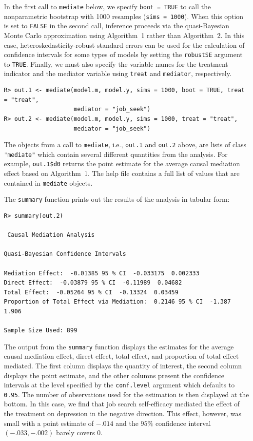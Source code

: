 \documentclass[11pt,letterpaper]{article}
\theoremstyle{plain}
\begin{document}
In the first call to \texttt{mediate} below, we specify \texttt{boot
  = TRUE} to call the nonparametric bootstrap with 1000 resamples
({\tt sims = 1000}). When this option is set to {\tt FALSE} in the second
call, inference proceeds via the quasi-Bayesian Monte Carlo
approximation using Algorithm~1 rather than Algorithm~2.  In this case,
heteroskedasticity-robust standard errors can be used for the calculation of
confidence intervals for some types of models by setting the {\tt robustSE}
argument to {\tt TRUE}.  Finally, we must also
specify the variable names for the treatment indicator and the
mediator variable using {\tt treat} and {\tt mediator}, respectively.
\begin{verbatim}
R> out.1 <- mediate(model.m, model.y, sims = 1000, boot = TRUE, treat = "treat",
                    mediator = "job_seek")
R> out.2 <- mediate(model.m, model.y, sims = 1000, treat = "treat",
                    mediator = "job_seek")
\end{verbatim}
The objects from a call to \texttt{mediate}, i.e., {\tt out.1} and
{\tt out.2} above, are lists of class {\tt "mediate"} which contain several different
quantities from the analysis.  For example, \texttt{out.1\$d0} returns
the point estimate for the average causal mediation effect based on
Algorithm~1.  The help file contains a full list of values that are
contained in \texttt{mediate} objects.

The \texttt{summary}
function prints out the results of the analysis in tabular form:
\begin{verbatim}
R> summary(out.2)

 Causal Mediation Analysis

Quasi-Bayesian Confidence Intervals

Mediation Effect:  -0.01385 95 % CI  -0.033175  0.002333
Direct Effect:  -0.03879 95 % CI  -0.11989  0.04682
Total Effect:  -0.05264 95 % CI  -0.13324  0.03459
Proportion of Total Effect via Mediation:  0.2146 95 % CI  -1.387  1.906

Sample Size Used: 899
\end{verbatim}
The output from the {\tt summary} function displays the estimates
for the average causal mediation effect, direct effect, total effect,
and proportion of total effect mediated. The first column displays the
quantity of interest, the second column displays the point estimate,
and the other columns present the confidence intervals at the level
specified by the {\tt conf.level} argument which defaults to {\tt 0.95}.
The number of observations used for the estimation is then displayed at
the bottom.  In this case, we
find that job search self-efficacy mediated the effect of the
treatment on depression in the negative direction. This effect,
however, was small with a point estimate of $-.014$ and the $95\%$
confidence interval $(-.033,-.002)$ barely covers $0$.
\end{document}
